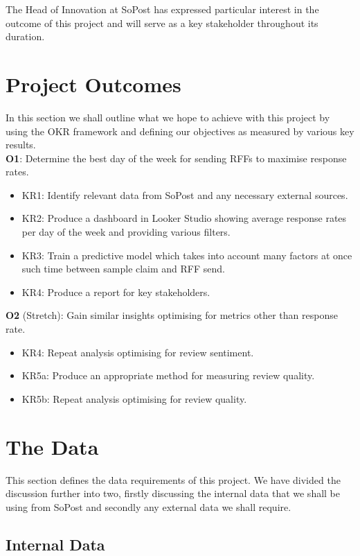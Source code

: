 \documentclass[12pt]{scrartcl}
\begin{document}
The Head of Innovation at SoPost has expressed particular interest in the outcome
of this project and will serve as a key stakeholder throughout its duration.

\section{Project Outcomes}

In this section we shall outline what we hope to achieve with this project by using
the OKR framework and defining our objectives as measured by various key results.\\

\textbf{O1}: Determine the best day of the week for sending RFFs to maximise response rates.
\begin{itemize}
    \item KR1: Identify relevant data from SoPost and any necessary external sources.
    \item KR2: Produce a dashboard in Looker Studio showing average response rates
        per day of the week and providing various filters.
    \item KR3: Train a predictive model which takes into account many factors at once
        such time between sample claim and RFF send.
    \item KR4: Produce a report for key stakeholders.
\end{itemize}

\textbf{O2} (Stretch): Gain similar insights optimising for metrics other than response rate.
\begin{itemize}
    \item KR4: Repeat analysis optimising for review sentiment.
    \item KR5a: Produce an appropriate method for measuring review quality.
    \item KR5b: Repeat analysis optimising for review quality.
\end{itemize}

\section{The Data}

This section defines the data requirements of this project. We have divided
the discussion further into two, firstly discussing the internal data that
we shall be using from SoPost and secondly any external data we shall require.

\subsection{Internal Data}
\end{document}
